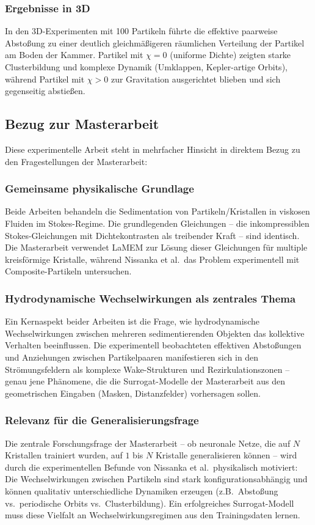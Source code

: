 \documentclass[a4paper,12pt]{article}
\begin{document}
\subsubsection*{Ergebnisse in 3D}
In den 3D-Experimenten mit 100 Partikeln führte die effektive paarweise Abstoßung zu einer deutlich gleichmäßigeren räumlichen Verteilung der Partikel am Boden der Kammer. Partikel mit $\chi = 0$ (uniforme Dichte) zeigten starke Clusterbildung und komplexe Dynamik (Umklappen, Kepler-artige Orbits), während Partikel mit $\chi > 0$ zur Gravitation ausgerichtet blieben und sich gegenseitig abstießen.

\subsection*{Bezug zur Masterarbeit}

Diese experimentelle Arbeit steht in mehrfacher Hinsicht in direktem Bezug zu den Fragestellungen der Masterarbeit:

\subsubsection*{Gemeinsame physikalische Grundlage}
Beide Arbeiten behandeln die Sedimentation von Partikeln/Kristallen in viskosen Fluiden im Stokes-Regime. Die grundlegenden Gleichungen -- die inkompressiblen Stokes-Gleichungen mit Dichtekontrasten als treibender Kraft -- sind identisch. Die Masterarbeit verwendet LaMEM zur Lösung dieser Gleichungen für multiple kreisförmige Kristalle, während Nissanka et al.\ das Problem experimentell mit Composite-Partikeln untersuchen.

\subsubsection*{Hydrodynamische Wechselwirkungen als zentrales Thema}
Ein Kernaspekt beider Arbeiten ist die Frage, wie hydrodynamische Wechselwirkungen zwischen mehreren sedimentierenden Objekten das kollektive Verhalten beeinflussen. Die experimentell beobachteten effektiven Abstoßungen und Anziehungen zwischen Partikelpaaren manifestieren sich in den Strömungsfeldern als komplexe Wake-Strukturen und Rezirkulationszonen -- genau jene Phänomene, die die Surrogat-Modelle der Masterarbeit aus den geometrischen Eingaben (Masken, Distanzfelder) vorhersagen sollen.

\subsubsection*{Relevanz für die Generalisierungsfrage}
Die zentrale Forschungsfrage der Masterarbeit -- ob neuronale Netze, die auf $N$ Kristallen trainiert wurden, auf $1$ bis $N$ Kristalle generalisieren können -- wird durch die experimentellen Befunde von Nissanka et al.\ physikalisch motiviert: Die Wechselwirkungen zwischen Partikeln sind stark konfigurationsabhängig und können qualitativ unterschiedliche Dynamiken erzeugen (z.B.\ Abstoßung vs.\ periodische Orbits vs.\ Clusterbildung). Ein erfolgreiches Surrogat-Modell muss diese Vielfalt an Wechselwirkungsregimen aus den Trainingsdaten lernen.
\end{document}
